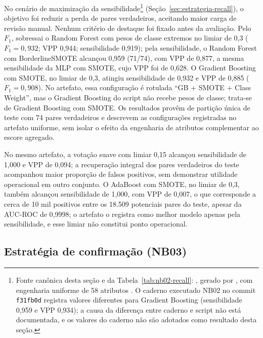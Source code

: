 No cenário de maximização da sensibilidade\footnote{Fonte canônica desta seção e da Tabela~\ref{tab:nb02-recall}: , gerado por , com engenharia uniforme de 58 atributos \cite{Jardim2026phdrepo}. O caderno executado NB02 no commit \texttt{f31fb0d} registra valores diferentes para Gradient Boosting (sensibilidade 0,959 e VPP 0,934); a causa da diferença entre caderno e script não está documentada, e os valores do caderno não são adotados como resultado desta seção.} (Seção~\ref{sec:estrategia-recall}), o objetivo foi reduzir a perda de pares verdadeiros, aceitando maior carga de revisão manual. Nenhum critério de destaque foi fixado antes da avaliação. Pelo $F_1$, sobressai o Random Forest com pesos de classe extremos no limiar de 0,3 ($F_1=0{,}932$; VPP 0,944; sensibilidade 0,919); pela sensibilidade, o Random Forest com BorderlineSMOTE alcançou 0,959 (71/74), com VPP de 0,877, a mesma sensibilidade da MLP com SMOTE, cujo VPP foi de 0,628. O Gradient Boosting com SMOTE, no limiar de 0,3, atingiu sensibilidade de 0,932 e VPP de 0,885 ($F_1=0{,}908$). No artefato, essa configuração é rotulada ``GB + SMOTE + Class Weight'', mas o Gradient Boosting do script não recebe pesos de classe; trata-se de Gradient Boosting com SMOTE. Os resultados provêm de partição única de teste com 74 pares verdadeiros e descrevem as configurações registradas no artefato uniforme, sem isolar o efeito da engenharia de atributos complementar ao escore agregado.



No mesmo artefato, a votação suave com limiar 0,15 alcançou sensibilidade de 1,000 e VPP de 0,094; a recuperação integral dos pares verdadeiros do teste acompanhou maior proporção de falsos positivos, sem demonstrar utilidade operacional em outro conjunto. O AdaBoost com SMOTE, no limiar de 0,3, também alcançou sensibilidade de 1,000, com VPP de 0,007, o que corresponde a cerca de 10 mil positivos entre os 18.509 potenciais pares do teste, apesar da AUC-ROC de 0,9998; o artefato o registra como melhor modelo apenas pela sensibilidade, e esse limiar não constitui ponto operacional.

\subsection{Estratégia de confirmação (NB03)}\label{sec:e3-nb03}

